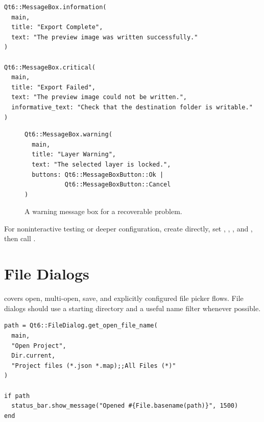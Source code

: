 
\begin{lstlisting}[style=crystal]
Qt6::MessageBox.information(
  main,
  title: "Export Complete",
  text: "The preview image was written successfully."
)

Qt6::MessageBox.critical(
  main,
  title: "Export Failed",
  text: "The preview image could not be written.",
  informative_text: "Check that the destination folder is writable."
)
\end{lstlisting}

\begin{figure}[htbp]
  \begin{lstlisting}[style=crystal]
Qt6::MessageBox.warning(
  main,
  title: "Layer Warning",
  text: "The selected layer is locked.",
  buttons: Qt6::MessageBoxButton::Ok |
           Qt6::MessageBoxButton::Cancel
)
  \end{lstlisting}
  \centering
  \caption{A warning message box for a recoverable problem.}
\end{figure}

\clearpage

For noninteractive testing or deeper configuration, create  directly, set , , , and , then call .

\section{File Dialogs}

 covers open, multi-open, save, and explicitly configured file picker flows. File dialogs should use a starting directory and a useful name filter whenever possible.


\begin{lstlisting}[style=crystal]
path = Qt6::FileDialog.get_open_file_name(
  main,
  "Open Project",
  Dir.current,
  "Project files (*.json *.map);;All Files (*)"
)

if path
  status_bar.show_message("Opened #{File.basename(path)}", 1500)
end
\end{lstlisting}

